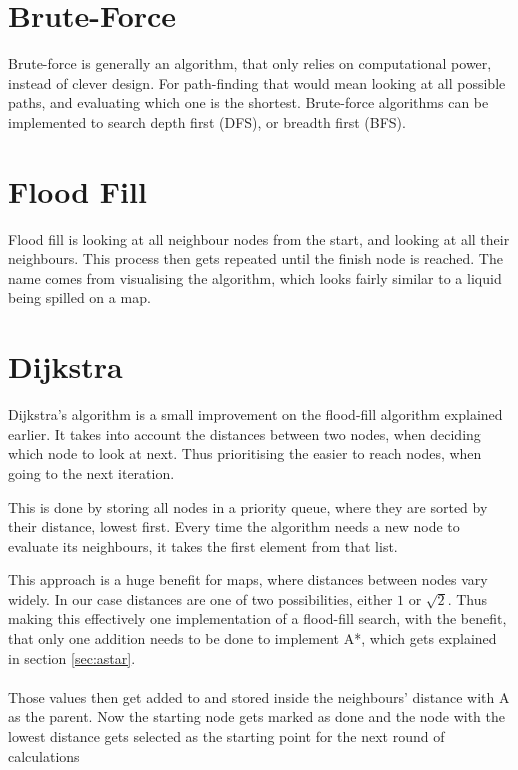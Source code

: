 \section{Brute-Force}\label{sec:brute}
Brute-force is generally an algorithm,
that only relies on computational power,
instead of clever design.
For path-finding that would mean looking at all possible paths,
and evaluating which one is the shortest.
Brute-force algorithms can be implemented to search depth first (DFS), or breadth first (BFS).

\section{Flood Fill}\label{sec:fill}
Flood fill is looking at all neighbour nodes from the start,
and looking at all their neighbours.
This process then gets repeated until the finish node is reached.
The name comes from visualising the algorithm,
which looks fairly similar to a liquid being spilled on a map.
\cite{Jaimini2017}


\section{Dijkstra}\label{sec:dijkstra}
Dijkstra's algorithm is a small improvement on the flood-fill algorithm explained earlier.
It takes into account the distances between two nodes,
when deciding which node to look at next.
Thus prioritising the easier to reach nodes, when going to the next iteration.

This is done by storing all nodes in a priority queue,
where they are sorted by their distance, lowest first.
Every time the algorithm needs a new node to evaluate its neighbours,
it takes the first element from that list.

This approach is a huge benefit for maps,
where distances between nodes vary widely.
In our case distances are one of two possibilities, either $1$ or $ \sqrt{2} $.
Thus making this effectively one implementation of a flood-fill search,
with the benefit, that only one addition needs to be done to implement A*,
which gets explained in section \ref{sec:astar}.
\\\\
Those values then get added to and stored  inside the neighbours' distance with A as the parent.
Now the starting node gets marked as done
and the node with the lowest distance gets selected
as the starting point for the next round of calculations

